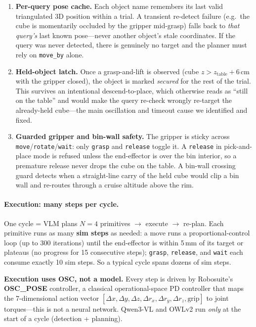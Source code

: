 \documentclass[conference]{IEEEtran}
\providecommand{\alert}[1]{\textbf{\textcolor{accent2}{#1}}}
\begin{document}
\begin{enumerate}
    \item \textbf{Per-query pose cache.} Each object name remembers its last valid triangulated 3D position within a trial. A transient re-detect failure (e.g.\ the cube is momentarily occluded by the gripper mid-grasp) falls back to \emph{that query's} last known pose---never another object's stale coordinates. If the query was never detected, there is genuinely no target and the planner must rely on \texttt{move\_by} alone.
    \item \textbf{Held-object latch.} Once a grasp-and-lift is observed (cube $z>z_\text{table}+6$\,cm with the gripper closed), the object is marked \emph{secured} for the rest of the trial. This survives an intentional descend-to-place, which otherwise reads as ``still on the table'' and would make the query re-check wrongly re-target the already-held cube---the main oscillation and timeout cause we identified and fixed.
    \item \textbf{Guarded gripper and bin-wall safety.} The gripper is sticky across \texttt{move}/\texttt{rotate}/\texttt{wait}: only \texttt{grasp} and \texttt{release} toggle it. A \texttt{release} in pick-and-place mode is refused unless the end-effector is over the bin interior, so a premature release never drops the cube on the table. A bin-wall crossing guard detects when a straight-line carry of the held cube would clip a bin wall and re-routes through a cruise altitude above the rim.
\end{enumerate}

\paragraph{Execution: many steps per cycle.}
One cycle = VLM plans $N=4$ primitives $\to$ execute $\to$ re-plan. Each primitive runs as many \alert{sim steps} as needed: a move runs a proportional-control loop (up to 300 iterations) until the end-effector is within 5\,mm of its target or plateaus (no progress for 15 consecutive steps); \texttt{grasp}, \texttt{release}, and \texttt{wait} each consume exactly 10 sim steps. So a typical cycle spans dozens of sim steps.

\textbf{Execution uses OSC, not a model.} Every step is driven by Robosuite's \alert{OSC\_POSE} controller, a classical operational-space PD controller that maps the 7-dimensional action vector $[\Delta x,\Delta y,\Delta z,\Delta r_x,\Delta r_y,\Delta r_z,\text{grip}]$ to joint torques---this is not a neural network. Qwen3-VL and OWLv2 run \emph{only} at the start of a cycle (detection + planning).
\end{document}
